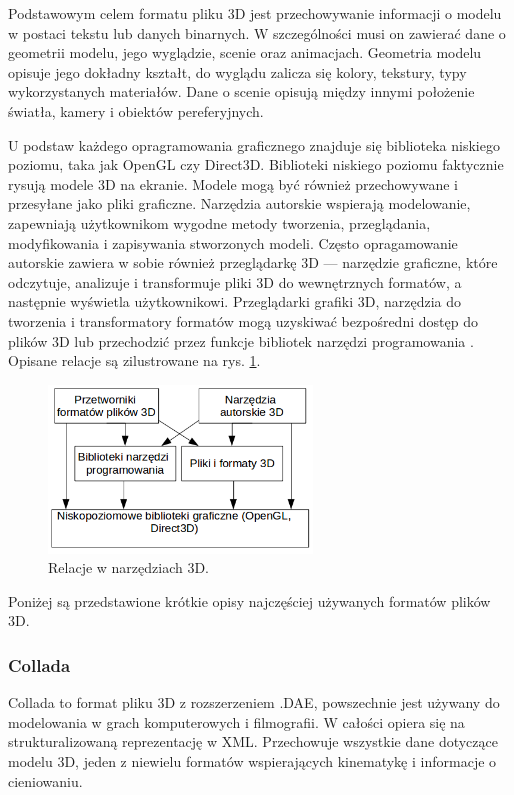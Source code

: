 Podstawowym celem formatu pliku 3D jest przechowywanie informacji o modelu w postaci tekstu lub danych binarnych. W szczególności musi on zawierać dane o geometrii modelu, jego wyglądzie, scenie oraz animacjach. Geometria modelu opisuje jego dokładny kształt, do wyglądu zalicza się kolory, tekstury, typy wykorzystanych materiałów. Dane o scenie opisują między innymi położenie światła, kamery i obiektów pereferyjnych. 

U podstaw każdego opragramowania graficznego znajduje się biblioteka niskiego poziomu, taka jak OpenGL czy Direct3D. Biblioteki niskiego poziomu faktycznie rysują modele 3D na ekranie. Modele mogą być również przechowywane i przesyłane jako pliki graficzne. Narzędzia autorskie wspierają modelowanie, zapewniają użytkownikom wygodne metody tworzenia, przeglądania, modyfikowania i zapisywania stworzonych modeli. Często opragamowanie autorskie zawiera w sobie również przeglądarkę 3D --- narzędzie graficzne, które odczytuje, analizuje i transformuje pliki 3D do wewnętrznych formatów, a następnie wyświetla użytkownikowi. Przeglądarki grafiki 3D, narzędzia do tworzenia i transformatory formatów mogą uzyskiwać bezpośredni dostęp do plików 3D lub przechodzić przez funkcje bibliotek narzędzi programowania \cite{formatsinfo}. Opisane relacje są zilustrowane na rys. \ref{rys5}.
\begin{figure}[H]
		\centering
 		\includegraphics[width=7.0cm]{relacje.png}
    	\caption{Relacje w narzędziach 3D.}
 		\label{rys5}
\end{figure}
Poniżej są przedstawione krótkie opisy najczęściej używanych formatów plików 3D.

\subsubsection{Collada}
Collada to format pliku 3D z rozszerzeniem .DAE, powszechnie jest używany do modelowania w grach komputerowych i filmografii. W całości opiera się na strukturalizowaną reprezentację w XML. Przechowuje wszystkie dane dotyczące modelu 3D, jeden z niewielu formatów wspierających kinematykę i informacje o cieniowaniu.

